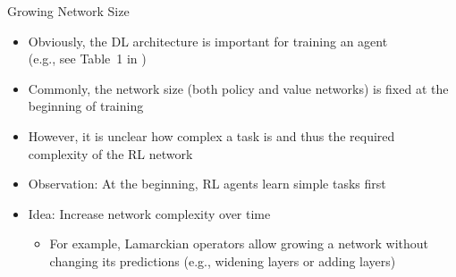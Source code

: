 \documentclass[aspectratio=169]{../latex_main/tntbeamer}  %
\begin{document}
\begin{frame}[c]{Growing Network Size}


\begin{itemize}
    \item Obviously, the DL architecture is important for training an agent\\ (e.g., see Table~1 in )
    \item Commonly, the network size (both policy and value networks) is fixed at the beginning of training
    \item However, it is unclear how complex a task is and thus the required complexity of the RL network
    \item Observation: At the beginning, RL agents learn simple tasks first
    \item Idea: Increase network complexity over time 
    \begin{itemize}
        \item For example, Lamarckian operators allow growing a network without changing its predictions (e.g., widening layers or adding layers) 
    \end{itemize}
    
\end{itemize}

\end{frame}
\end{document}

